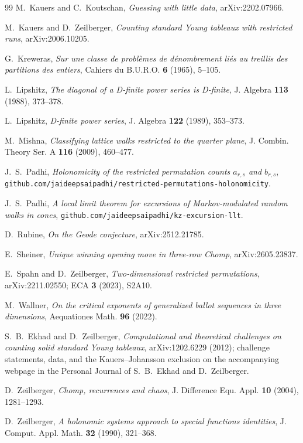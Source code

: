 \documentclass[11pt]{article}
\theoremstyle{definition}
\begin{document}
\begin{thebibliography}{99}
 M.~Kauers and C.~Koutschan, \emph{Guessing with little data},
arXiv:2202.07966.

 M.~Kauers and D.~Zeilberger, \emph{Counting standard Young
tableaux with restricted runs}, arXiv:2006.10205.

 G.~Kreweras, \emph{Sur une classe de probl\`emes de
d\'enombrement li\'es au treillis des partitions des entiers}, Cahiers du
B.U.R.O. \textbf{6} (1965), 5--105.

 L.~Lipshitz, \emph{The diagonal of a D-finite power
series is D-finite}, J. Algebra \textbf{113} (1988), 373--378.

 L.~Lipshitz, \emph{D-finite power series}, J. Algebra
\textbf{122} (1989), 353--373.

 M.~Mishna, \emph{Classifying lattice walks restricted to the
quarter plane}, J. Combin. Theory Ser. A \textbf{116} (2009), 460--477.

 J.~S.~Padhi, \emph{Holonomicity of the restricted permutation
counts $a_{r,s}$ and $b_{r,s}$},
\texttt{github.com/jaideepsaipadhi/restricted-permutations-holonomicity}.

 J.~S.~Padhi, \emph{A local limit theorem for excursions of
Markov-modulated random walks in cones},
\texttt{github.com/jaideepsaipadhi/kz-excursion-llt}.

 D.~Rubine, \emph{On the Geode conjecture}, arXiv:2512.21785.

 E.~Sheiner, \emph{Unique winning opening move in three-row
Chomp}, arXiv:2605.23837.

 E.~Spahn and D.~Zeilberger, \emph{Two-dimensional restricted
permutations}, arXiv:2211.02550; ECA \textbf{3} (2023), S2A10.

 M.~Wallner, \emph{On the critical exponents of generalized
ballot sequences in three dimensions}, Aequationes Math. \textbf{96} (2022).

 S.~B.~Ekhad and D.~Zeilberger, \emph{Computational and
theoretical challenges on counting solid standard Young tableaux},
arXiv:1202.6229 (2012); challenge statements, data, and the
Kauers--Johansson exclusion on the accompanying webpage in the Personal
Journal of S.~B.~Ekhad and D.~Zeilberger.

 D.~Zeilberger, \emph{Chomp, recurrences and chaos},
J. Difference Equ. Appl. \textbf{10} (2004), 1281--1293.

 D.~Zeilberger, \emph{A holonomic systems approach to
special functions identities}, J. Comput. Appl. Math. \textbf{32} (1990),
321--368.

\end{thebibliography}
\end{document}

